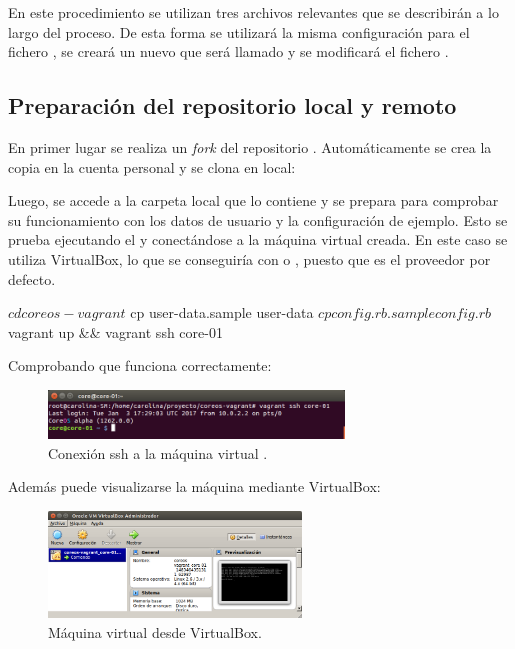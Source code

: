 En este procedimiento se utilizan tres archivos relevantes que se describirán a lo largo del proceso. De esta forma se utilizará la misma configuración para el fichero , se creará un nuevo  que será llamado  y se modificará el fichero .

\subsection{Preparación del repositorio local y remoto}

En primer lugar se realiza un \textit{fork} del repositorio . Automáticamente se crea la copia en la cuenta personal y se clona en local:


Luego, se accede a la carpeta local que lo contiene y se prepara para comprobar su funcionamiento con los datos de usuario y la configuración de ejemplo. Esto se prueba ejecutando el  y conectándose a la máquina virtual creada. En este caso se utiliza VirtualBox, lo que se conseguiría con  o , puesto que es el proveedor por defecto. 

\begin{code}
$ cd coreos-vagrant
$ cp user-data.sample user-data
$ cp config.rb.sample config.rb
$ vagrant up && vagrant ssh core-01
\end{code}

Comprobando que funciona correctamente:

\begin{figure}[H]
\centering
\includegraphics[width=0.7\textwidth]{images/figures/vagrantssh.png}
\caption{Conexión ssh a la máquina virtual .}
\end{figure}

Además puede visualizarse la máquina mediante VirtualBox:

\begin{figure}[H]
\centering
\includegraphics[width=0.6\textwidth]{images/figures/vboxcore01.png}
\caption{Máquina virtual  desde VirtualBox.}
\end{figure}


